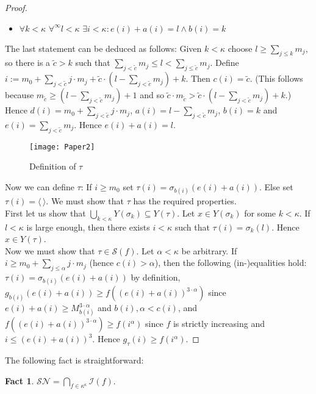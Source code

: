 \documentclass[12pt,a4paper]{scrartcl}
\theoremstyle{definition}
\newtheorem{fact}[definition]{Fact}
\numberwithin{equation}{section}
\begin{document}
\begin{proof}
\begin{itemize}
\item $\forall k <\kappa \,\, \forall^{\infty} l < \kappa \,\, \exists i < \kappa \colon e(i) + a(i)=l \land b(i)=k$
\end{itemize}
The last statement can be deduced as follows: Given $k < \kappa$ choose $l \geq \sum_{j \leq k}  m_j$, so there is a $\tilde{c}>k$ such that $\sum_{j < \tilde{c}}  m_j \leq l <\sum_{j \leq \tilde{c}}  m_j$. Define $i:= m_0+ \sum_{j < \tilde{c}} j \cdot m_j + \tilde{c} \cdot (l - \sum_{j < \tilde{c}}  m_j) + k $. Then $c(i)=\tilde{c}$. (This follows because $m_{\tilde{c}} \geq (l - \sum_{j < \tilde{c}}  m_j) +1$ and so $\tilde{c} \cdot m_{\tilde{c}} > \tilde{c} \cdot (l - \sum_{j < \tilde{c}}  m_j) +k$.) Hence $d(i) = m_0+ \sum_{j < \tilde{c}} j \cdot m_j$, $a(i)= l - \sum_{j < \tilde{c}}  m_j$, $b(i)=k$ and $e(i)= \sum_{j < \tilde{c}}  m_j$. Hence $e(i) + a(i)=l$.

\begin{figure}[h]
 \centering
 \texttt{[image: Paper2]}
 \caption{Definition of $\tau$}
 \label{Figure 1}
\end{figure}

Now we can define $\tau$: If $i\geq m_0$ set $\tau (i) = \sigma_{b(i)} (e(i)+ a(i))$. Else set $\tau (i)= \langle \, \rangle$. We must show that $\tau$ has the required properties.\\
First let us show that $\bigcup_{k < \kappa} Y(\sigma_k) \subseteq Y(\tau)$.  Let $x \in Y(\sigma_k)$ for some $k< \kappa$. If $l < \kappa$ is large enough, then there exists $i < \kappa$ such that $\tau (i) = \sigma_k (l)$. Hence $x \in Y(\tau)$.\\
Now we must show that $\tau \in \mathcal{S}(f)$. Let $\alpha < \kappa$ be arbitrary. If $i \geq m_0+\sum_{j \leq \alpha} j \cdot m_j$ (hence $c(i)> \alpha$), then the following (in-)equalities hold: $\tau (i) = \sigma_{b(i)}(e(i)+a(i))$ by definition, $g_{b(i)}(e(i)+a(i)) \geq f((e(i)+a(i))^{3 \cdot \alpha})$ since $e(i)+a(i) \geq M_{b(i)}^{3 \cdot \alpha}$ and $b(i), \alpha < c(i)$, and $f((e(i)+a(i))^{3 \cdot \alpha}) \geq f(i^\alpha)$ since $f$ is strictly increasing and $i \leq (e(i)+a(i))^3 $. Hence $g_{\tau} (i) \geq f(i^\alpha)$.
\end{proof}

The following fact is straightforward:

\begin{fact}
$\mathcal{SN} = \bigcap_{f \in \kappa^\kappa} \mathcal{I}(f)$.
\end{fact}
\end{document}

